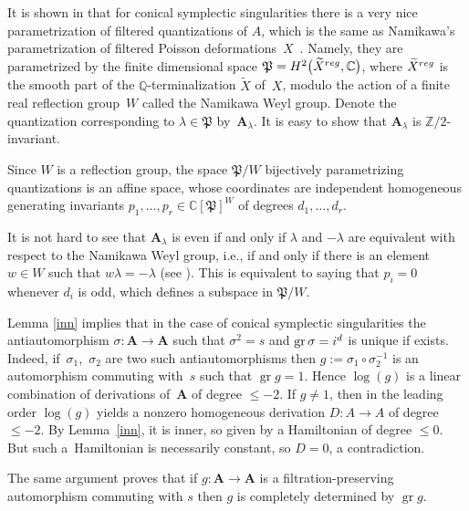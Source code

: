 \documentclass[11pt]{article}
\numberwithin{equation}{section}
\numberwithin{equation}{section}
\begin{document}
It is shown in \cite{L2} that for conical symplectic singularities there is a very nice parametrization of filtered quantizations of $A$, which is the same as Namikawa's parametrization of filtered Poisson deformations~$X$~\cite{Na3}. Namely, they are parametrized by the finite dimensional space $\mathfrak{P}=H^2\big(\widetilde X^{\rm reg},{\mathbb C}\big)$, where $\widetilde X^{\rm reg}$ is the smooth part of the ${\mathbb Q}$-terminalization $\widetilde X$ of~$X$, modulo the action of a finite real reflection group~$W$ called the Namikawa Weyl group. Denote the quantization corresponding to $\lambda\in \mathfrak{P}$ by~${\mathbf A}_\lambda$. It is easy to show that ${\mathbf A}_\lambda$ is ${\mathbb Z}/2$-invariant.

Since $W$ is a reflection group, the space $\mathfrak{P}/W$ bijectively parametrizing quantizations is an affine space, whose coordinates are independent homogeneous generating invariants $p_1,\dots,p_r\in {\mathbb C}[\mathfrak{P}]^W$ of degrees $d_1,\dots,d_r$.

It is not hard to see that ${\mathbf A}_\lambda$ is even if and only if $\lambda$ and $-\lambda$ are equivalent with respect to the Namikawa Weyl group, i.e., if and only if there is an element $w\in W$ such that $w\lambda=-\lambda$ (see \cite{BPR}). This is equivalent to saying that $p_i=0$ whenever $d_i$ is odd, which defines a subspace in
$\mathfrak{P}/W$.

\begin{Remark}Lemma \ref{inn} implies that in the case of conical symplectic singularities the antiautomorphism $\sigma\colon {\mathbf A}\to {\mathbf A}$ such that $\sigma^2=s$ and $\operatorname{gr}\sigma={\rm i}^d$ is unique if exists. Indeed, if~$\sigma_1$,~$\sigma_2$ are two such antiautomorphisms then $g:=\sigma_1\circ \sigma_2^{-1}$ is an automorphism commuting with~$s$ such that $\operatorname{gr} g=1$. Hence $\log (g)$ is a linear combination of derivations of~${\mathbf A}$ of degree $\le -2$. If $g\ne 1$, then in the leading order $\log(g)$ yields a nonzero homogeneous derivation $D\colon A\to A$ of degree $\le -2$. By Lemma~\ref{inn}, it is inner, so given by a Hamiltonian of degree $\le 0$. But such a~Hamiltonian is necessarily constant, so $D=0$, a contradiction.

The same argument proves that if $g\colon {\mathbf A}\to {\mathbf A}$ is a filtration-preserving
automorphism commuting with $s$ then $g$ is completely determined by $\operatorname{gr}g$.
\end{Remark}
\end{document}
